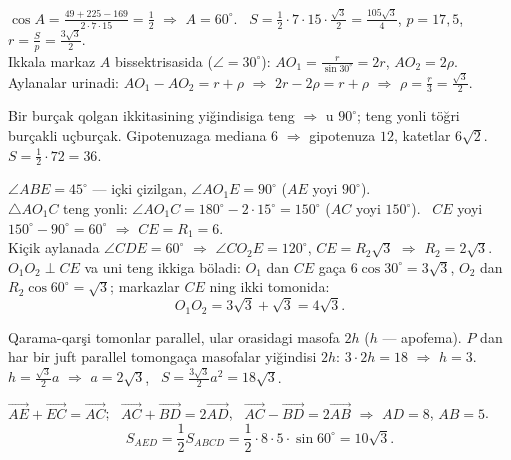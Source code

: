 $\cos A=\frac{49+225-169}{2\cdot7\cdot15}=\frac12$ $\Rightarrow$ $A=60^\circ$. \ $S=\frac12\cdot7\cdot15\cdot\frac{\sqrt3}2=\frac{105\sqrt3}4$, $p=17{,}5$, $r=\frac Sp=\frac{3\sqrt3}2$.\\
Ikkala markaz $A$ bissektrisasida ($\angle=30^\circ$): $AO_1=\frac r{\sin30^\circ}=2r$, $AO_2=2\rho$. Aylanalar urinadi: $AO_1-AO_2=r+\rho$ $\Rightarrow$ $2r-2\rho=r+\rho$ $\Rightarrow$ $\rho=\frac r3=\frac{\sqrt3}2$.

Bir burçak qolgan ikkitasining yiğindisiga teng $\Rightarrow$ u $90^\circ$; teng yonli töğri burçakli uçburçak. Gipotenuzaga mediana $6$ $\Rightarrow$ gipotenuza $12$, katetlar $6\sqrt2$. \ $S=\frac12\cdot72=36$.

$\angle ABE=45^\circ$ — içki çizilgan, $\angle AO_1E=90^\circ$ ($AE$ yoyi $90^\circ$).\\
$\triangle AO_1C$ teng yonli: $\angle AO_1C=180^\circ-2\cdot15^\circ=150^\circ$ ($AC$ yoyi $150^\circ$). \ $CE$ yoyi $150^\circ-90^\circ=60^\circ$ $\Rightarrow$ $CE=R_1=6$.\\
Kiçik aylanada $\angle CDE=60^\circ$ $\Rightarrow$ $\angle CO_2E=120^\circ$, $CE=R_2\sqrt3$ $\Rightarrow$ $R_2=2\sqrt3$.\\
$O_1O_2\perp CE$ va uni teng ikkiga böladi: $O_1$ dan $CE$ gaça $6\cos30^\circ=3\sqrt3$, $O_2$ dan $R_2\cos60^\circ=\sqrt3$; markazlar $CE$ ning ikki tomonida:
\[O_1O_2=3\sqrt3+\sqrt3=4\sqrt3.\]

Qarama-qarşi tomonlar parallel, ular orasidagi masofa $2h$ ($h$ — apofema). $P$ dan har bir juft parallel tomongaça masofalar yiğindisi $2h$: $3\cdot2h=18$ $\Rightarrow$ $h=3$.\\
$h=\frac{\sqrt3}2a$ $\Rightarrow$ $a=2\sqrt3$, \ $S=\frac{3\sqrt3}2a^2=18\sqrt3$.

$\overrightarrow{AE}+\overrightarrow{EC}=\overrightarrow{AC}$; \ $\overrightarrow{AC}+\overrightarrow{BD}=2\overrightarrow{AD}$, \ $\overrightarrow{AC}-\overrightarrow{BD}=2\overrightarrow{AB}$ $\Rightarrow$ $AD=8$, $AB=5$.
\[S_{AED}=\frac12S_{ABCD}=\frac12\cdot8\cdot5\cdot\sin60^\circ=10\sqrt3.\]


